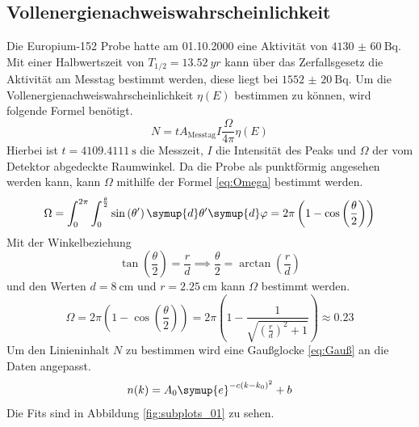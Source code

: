 \subsection{Vollenergienachweiswahrscheinlichkeit}
\label{cap:Vollenergienachweiswahrscheinlichkeit}

Die Europium-152 Probe hatte am 01.10.2000 eine Aktivität von $\SI{4130(60)}{\becquerel}$. Mit einer 
Halbwertszeit von $T_{1/2} = \SI{13.52}{yr}$ kann über das Zerfallsgesetz die Aktivität 
am Messtag bestimmt werden, diese liegt bei $\SI{1552(20)}{\becquerel}$.
Um die Vollenergienachweiswahrscheinlichkeit $\eta(E)$ bestimmen zu können, wird folgende Formel benötigt.
\begin{equation}
  \label{eq:eta_N}
  N = tA_{\text{Messtag}}I\frac{\Omega}{4\pi}\eta(E)
\end{equation}
Hierbei ist $t=\SI{4109.4111}{\second}$ die Messzeit, $I$ die Intensität  des Peaks und $\Omega$ der vom Detektor abgedeckte
Raumwinkel.
Da die Probe als punktförmig angesehen werden kann, kann $\Omega$ mithilfe der Formel \eqref{eq:Omega} bestimmt werden.
\begin{equation}
  \label{eq:Omega}
  \Omega = \int_{0}^{2\pi}\int_{0}^{\frac{\theta}{2}} \sin\left(\theta'\right)\symup{d}\theta'\symup{d}\varphi = 
  2\pi \left(1-\cos\left(\frac{\theta}{2}\right)\right)
\end{equation}
Mit der Winkelbeziehung 
\begin{equation*}
  \tan\left(\frac{\theta}{2}\right) = \frac{r}{d} \implies \frac{\theta}{2} = \arctan\left(\frac{r}{d}\right)
\end{equation*}
und den Werten $d = \SI{8}{\centi\meter}$ und $r = \SI{2.25}{\centi\meter}$ kann $\Omega$ bestimmt werden.
\begin{equation*}
  \Omega = 2\pi \left(1-\cos\left(\frac{\theta}{2}\right)\right) = 2\pi\left(1- \frac{1}{\sqrt{\left(\frac{r}{d}\right)^2+1}}\right) \approx \num{0.23}
\end{equation*}
Um den Linieninhalt $N$ zu bestimmen wird eine Gaußglocke \eqref{eq:Gauß} an die Daten angepasst.
\begin{equation}
  \label{eq:Gauß}
  n(k)= A_0 \symup{e}^{-c(k-k_0)^2} + b
\end{equation}
Die Fits sind in Abbildung \ref{fig:subplots_01} zu sehen.
\FloatBarrier

